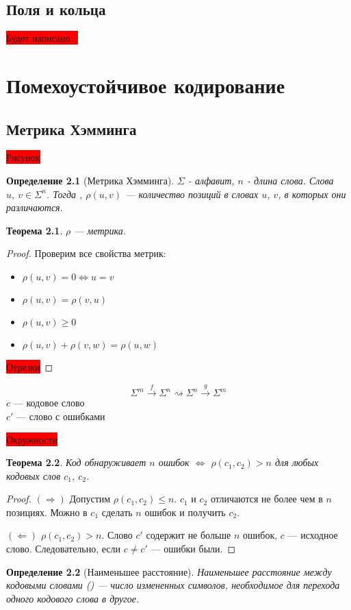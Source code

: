 \documentclass[a4paper,14pt, draft]{report}
\newtheorem{theorem}{Теорема}
\newtheorem{definition}{Определение}
\begin{document}
\section{Поля и кольца}
\colorbox{red}{Будет написано...}
\chapter{Помехоустойчивое кодирование}
\section{Метрика Хэмминга}
\colorbox{red}{Рисунок}
\begin{definition}[Метрика Хэмминга]
$\Sigma$ - алфавит, $n$ - длина слова. Слова $u,~v\in\Sigma^n$. Тогда , $\rho(u, v)$ --- количество позиций в словах $u$, $v$, в которых они различаются.
\end{definition}
\begin{theorem}$\rho$ --- метрика.
\end{theorem}
\begin{proof}
Проверим все свойства метрик: \begin{itemize}
    \item $\rho(u, v) = 0 \Leftrightarrow u = v$
    \item $\rho(u, v) = \rho(v, u)$
    \item $\rho(u, v) \ge 0$
    \item $\rho(u, v) + \rho(v, w) = \rho(u, w)$
\end{itemize}

\colorbox{red}{Отрезки}
\end{proof}

$$\Sigma^m \xrightarrow{f}\Sigma^n\rightsquigarrow\Sigma^n\xrightarrow{g}\Sigma^m$$
$c$ --- кодовое слово\\$c'$ --- слово с ошибками

\colorbox{red}{Окружности}

\begin{theorem}Код обнаруживает $n$ ошибок $\Leftrightarrow$ $\rho(c_1, c_2) > n$ для любых кодовых слов $c_1$, $c_2$.
\end{theorem}
\begin{proof}$(\Rightarrow)$ Допустим $\rho(c_1, c_2)\le n$. $c_1$ и $c_2$ отличаются не более чем в $n$ позициях. Можно в $c_1$ сделать $n$ ошибок и получить $c_2$.

$(\Leftarrow)$ $\rho(c_1, c_2) > n$. Слово $c'$ содержит не больше $n$ ошибок, $c$ --- исходное слово. Следовательно, если $c \neq c'$ --- ошибки были.
\end{proof}
\begin{definition}[Наименьшее расстояние]
Наименьшее расстояние между кодовыми словами () --- число измененных символов, необходимое для перехода одного кодового слова в другое.
\end{definition}
\end{document}
